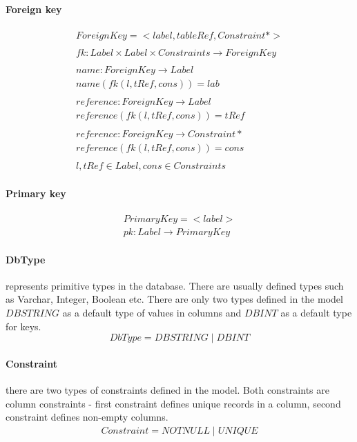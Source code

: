 \documentclass[11pt]{article}
\begin{document}
\paragraph{Foreign key}
\begin{gather*}
ForeignKey = <label, tableRef, Constraint*> \\ \\
fk : Label \times Label \times Constraints \rightarrow ForeignKey \\ \\
name : ForeignKey \rightarrow Label \\
name(fk(l, tRef, cons)) = lab  \\ \\
reference : ForeignKey \rightarrow Label  \\
reference(fk(l, tRef, cons)) = tRef  \\ \\
reference : ForeignKey \rightarrow Constraint*  \\
reference(fk(l, tRef, cons)) = cons  \\ \\
l, tRef \in Label, cons \in Constraints
\end{gather*}


\paragraph{Primary key}
\begin{gather*}
PrimaryKey =  < label > 	\\
pk : Label \rightarrow PrimaryKey
\end{gather*}

\paragraph{DbType} represents primitive types in the database. There are usually defined types such as Varchar, Integer, Boolean etc. There are only two types defined in the model $DBSTRING$ as a default type of values in columns and $DBINT$ as a default type for keys.
$$
DbType = DBSTRING \; | \; DBINT 
$$

\paragraph{Constraint} there are two types of constraints defined in the model. Both constraints are column constraints - first constraint defines unique records in a column, second constraint defines non-empty columns.
\begin{gather*}
Constraint = NOTNULL \; | \; UNIQUE 
\end{gather*}
\end{document}
